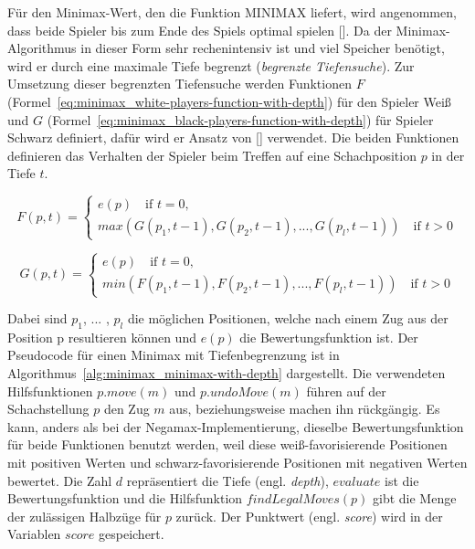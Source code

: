 Für den Minimax-Wert, den die Funktion $\text{MINIMAX}$ liefert, wird angenommen, dass beide Spieler bis zum Ende des Spiels optimal spielen [\cite{Russell2010}].
Da der Minimax-Algorithmus in dieser Form sehr rechenintensiv ist und viel Speicher benötigt, wird er durch eine maximale Tiefe begrenzt (\textit{begrenzte Tiefensuche}).
Zur Umsetzung dieser begrenzten Tiefensuche werden Funktionen $F$ (Formel~\ref{eq:minimax_white-players-function-with-depth}) für den Spieler Weiß und $G$ (Formel~\ref{eq:minimax_black-players-function-with-depth}) für Spieler Schwarz definiert, dafür wird er Ansatz von [\cite{Knuth1975}] verwendet.
Die beiden Funktionen definieren das Verhalten der Spieler beim Treffen auf eine Schachposition $p$ in der Tiefe $t$.

\begin{equation} \label{eq:minimax_white-players-function-with-depth}
    F(p, t) =
    \begin{cases}
        e(p) \quad \text{if } t = 0,\\
        max(G(p_1, t - 1), G(p_2, t - 1), ... , G(p_l, t - 1)) \quad \text{if } t > 0
    \end{cases}
\end{equation}

\begin{equation} \label{eq:minimax_black-players-function-with-depth}
    G(p, t) =
    \begin{cases}
        e(p) \quad \text{if } t = 0,\\
        min(F(p_1, t - 1), F(p_2, t - 1), ... , F(p_l, t - 1)) \quad \text{if } t > 0
    \end{cases}
\end{equation}

Dabei sind $p_1$, ... , $p_l$ die möglichen Positionen, welche nach einem Zug aus der Position p resultieren können und $e(p)$ die Bewertungsfunktion ist.
Der Pseudocode für einen Minimax mit Tiefenbegrenzung ist in Algorithmus~\ref{alg:minimax_minimax-with-depth} dargestellt.
Die verwendeten Hilfsfunktionen $p.move(m)$ und $p.undoMove(m)$ führen auf der Schachstellung $p$ den Zug $m$ aus, beziehungsweise machen ihn rückgängig.
Es kann, anders als bei der Negamax-Implementierung, dieselbe Bewertungsfunktion für beide Funktionen benutzt werden, weil diese weiß-favorisierende Positionen mit positiven Werten und schwarz-favorisierende Positionen mit negativen Werten bewertet.
Die Zahl $d$ repräsentiert die Tiefe (engl. \textit{depth}), $evaluate$ ist die Bewertungsfunktion und die Hilfsfunktion $findLegalMoves(p)$ gibt die Menge der zulässigen Halbzüge für $p$ zurück.
Der Punktwert (engl. \textit{score}) wird in der Variablen $score$ gespeichert.

